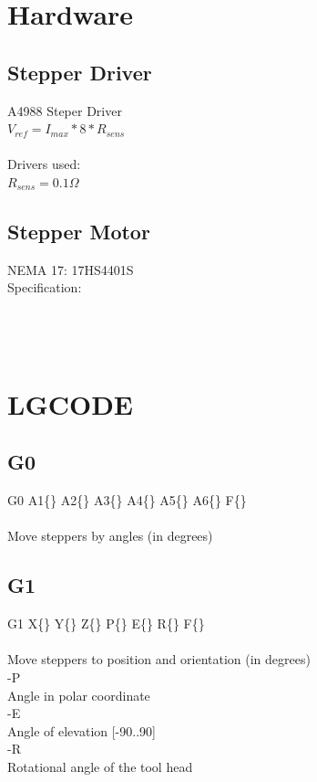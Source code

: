 \documentclass{article}
\begin{document}

\section{Hardware}
\subsection{Stepper Driver}
{A4988 Steper Driver} \\
$V_{ref} = I_{max} * 8 * R_{sens}$ \\ \\
{Drivers used:}\\
$R_{sens} = 0.1 \Omega $

\subsection{Stepper Motor}
{NEMA 17: 17HS4401S} \\
{Specification:}\\
 \\
 \\
 \\



\newpage
\section{LGCODE}
\subsection{G0}
G0 A1\{\} A2\{\} A3\{\} A4\{\} A5\{\} A6\{\} F\{\} \\ \\
Move steppers by angles (in degrees)

\subsection{G1}
G1 X\{\} Y\{\} Z\{\} P\{\} E\{\} R\{\} F\{\} \\ \\
Move steppers to position and orientation (in degrees) \\
\indent -P \\ \indent \indent Angle in polar coordinate \\
\indent -E \\ \indent \indent Angle of elevation [-90..90] \\
\indent -R \\ \indent \indent Rotational angle of the tool head
\end{document}

